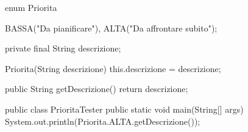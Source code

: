 \begin{unipdcode}[language=Java]
enum Priorita {
    BASSA("Da pianificare"),
    ALTA("Da affrontare subito");

    private final String descrizione;

    Priorita(String descrizione) {
        this.descrizione = descrizione;
    }

    public String getDescrizione() {
        return descrizione;
    }
}

public class PrioritaTester {
    public static void main(String[] args) {
        System.out.println(Priorita.ALTA.getDescrizione());
    }
}
\end{unipdcode}
